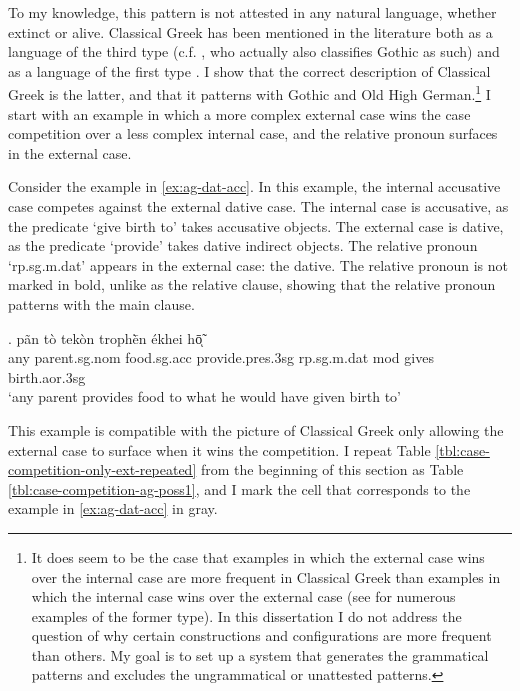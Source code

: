 To my knowledge, this pattern is not attested in any natural language, whether extinct or alive. Classical Greek has been mentioned in the literature both as a language of the third type (c.f. \citealt[120]{cinqueforthcoming}, who actually also classifies Gothic as such) and as a language of the first type \citep[cf.][41]{grosu1987}. I show that the correct description of Classical Greek is the latter, and that it patterns with Gothic and Old High German.\footnote{
It does seem to be the case that examples in which the external case wins over the internal case are more frequent in Classical Greek than examples in which the internal case wins over the external case (see \citealt{kakarikos2014} for numerous examples of the former type).
In this dissertation I do not address the question of why certain constructions and configurations are more frequent than others. My goal is to set up a system that generates the grammatical patterns and excludes the ungrammatical or unattested patterns.
}
I start with an example in which a more complex external case wins the case competition over a less complex internal case, and the relative pronoun surfaces in the external case.

Consider the example in \ref{ex:ag-dat-acc}. In this example, the internal accusative case competes against the external dative case.
The internal case is accusative, as the predicate  `give birth to' takes accusative objects.
The external case is dative, as the predicate  `provide' takes dative indirect objects.
The relative pronoun  `\ac{rp}.\ac{sg}.\ac{m}.\ac{dat}' appears in the external case: the dative. The relative pronoun is not marked in bold, unlike as the relative clause, showing that the relative pronoun patterns with the main clause.

\exg. pãn {tò tekòn} trophḕn ékhei hō̃ͅ  \\
any parent.\ac{sg}.\ac{nom} food.\ac{sg}.\ac{acc} provide.\ac{pres}.3\ac{sg}\scsub{[dat]} \ac{rp}.\ac{sg}.\ac{m}.\ac{dat} \ac{mod} {gives birth}.\ac{aor}.3\ac{sg}\scsub{[acc]}\\
`any parent provides food to what he would have given birth to' \label{ex:ag-dat-acc}

This example is compatible with the picture of Classical Greek only allowing the external case to surface when it wins the competition. I repeat Table \ref{tbl:case-competition-only-ext-repeated} from the beginning of this section as Table \ref{tbl:case-competition-ag-poss1}, and I mark the cell that corresponds to the example in \ref{ex:ag-dat-acc} in gray.

